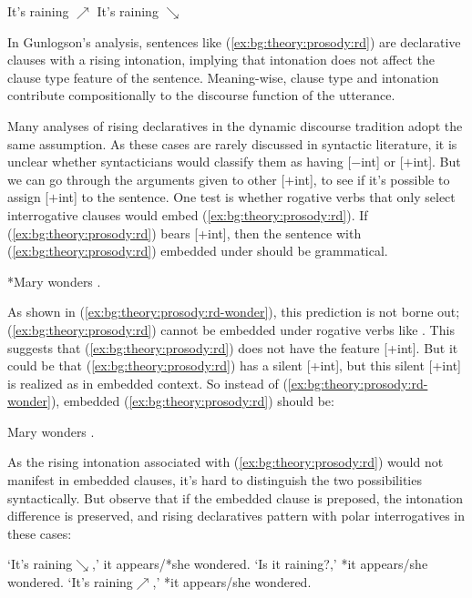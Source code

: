 It's raining $\nearrow$
\eex
{}
It's raining $\searrow$
\eex


In Gunlogson's \cite*{gunlogson2008} analysis, sentences like (\ref{ex:bg:theory:prosody:rd}) are declarative clauses with a rising intonation, implying that intonation does not affect the clause type feature of the sentence. Meaning-wise, clause type and intonation contribute compositionally to the discourse function of the utterance. 


Many analyses of rising declaratives in the dynamic discourse tradition adopt the same assumption. As these cases are rarely discussed in syntactic literature, it is unclear whether syntacticians would classify them as having [$-$int] or [$+$int]. But we can go through the arguments given to other [$+$int], to see if it's possible to assign [$+$int] to the sentence. One test is whether rogative verbs that only select interrogative clauses would embed (\ref{ex:bg:theory:prosody:rd}). If (\ref{ex:bg:theory:prosody:rd}) bears [+int], then the sentence with (\ref{ex:bg:theory:prosody:rd}) embedded under  should be grammatical.

*Mary wonders .
\eex

As shown in (\ref{ex:bg:theory:prosody:rd-wonder}), this prediction is not borne out; (\ref{ex:bg:theory:prosody:rd}) cannot be embedded under rogative verbs like . This suggests that (\ref{ex:bg:theory:prosody:rd}) does not have the feature [+int]. But it could be that (\ref{ex:bg:theory:prosody:rd}) has a silent [+int], but this silent [+int] is realized as  in embedded context. So instead of (\ref{ex:bg:theory:prosody:rd-wonder}), embedded (\ref{ex:bg:theory:prosody:rd}) should be:

Mary wonders .
\eex

As the rising intonation associated with (\ref{ex:bg:theory:prosody:rd}) would not manifest in embedded clauses, it's hard to distinguish the two possibilities syntactically. But \textcite{farkasroelofsen2017} observe that if the embedded clause is preposed, the intonation difference is preserved, and rising declaratives pattern with polar interrogatives in these cases:

\bxl{}
`It's raining$\searrow$,' it appears/*she wondered.
\ex`Is it raining?,' *it appears/she wondered.
\ex`It's raining$\nearrow$,' *it appears/she wondered.
\exl
\eex

